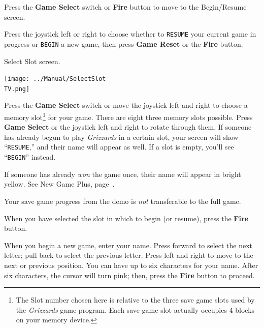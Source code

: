 \documentclass[10pt,twocolumn,openany,article]{memoir}
\newcommand\TV{NTSC} %
\begin{document}
Press the \textbf{Game Select} switch or \textbf{Fire} button to move to
the
\ifdefined\NOSAVE
Begin/Resume screen.

Press the  joystick left or  right to choose whether  to \texttt{RESUME}
your current game  in progress or \texttt{BEGIN} a new  game, then press
\textbf{Game Reset} or the \textbf{Fire} button.

\else
Select Slot screen.

\begin{center}
  \texttt{[image: ../Manual/SelectSlot\\TV.png]}
\end{center}

Press  the \textbf{Game  Select} switch  or move  the joystick  left and
right to  choose a  memory slot\ifdefined\ATARIAGESAVE\else\footnote{The
  Slot number chosen here is relative  to the three save game slots used
  by the \textit{Grizzards}  game program. Each save  game slot actually
  occupies  4  blocks  on  your  memory  device.}\fi{}  for  your  game.
There  are \ifdefined\ATARIAGESAVE  eight \else  three \fi  memory slots
possible. Press \textbf{Game  Select} or the joystick left  and right to
rotate   through  them.   If   someone  has   already   begun  to   play
\textit{Grizzards}   in  a   certain   slot,  your   screen  will   show
``\texttt{RESUME},'' and  their name will appear  as well. If a  slot is
empty, you'll see ``\texttt{BEGIN}'' instead.

If someone has already \emph{won} the  game once, their name will appear
in bright yellow. See New Game Plus, page~\pageref{sec:NewGamePlus}.

\ifdefined\DEMO

\skip

Your save game progress from the demo is \emph{not} transferable to the
full game.

\skip

\fi

When you have selected the slot in which to begin (or resume), press the
\textbf{Fire} button.

\fi

\ifdefined\NOSAVE\else

When you begin a new game, enter  your name. Press forward to select the
next letter;  pull back to  select the  previous letter. Press  left and
right to move to  the next or previous position. You can  have up to six
characters for  your name.  After six characters,  the cursor  will turn
pink; then, press the \textbf{Fire} button to proceed.
\end{document}
